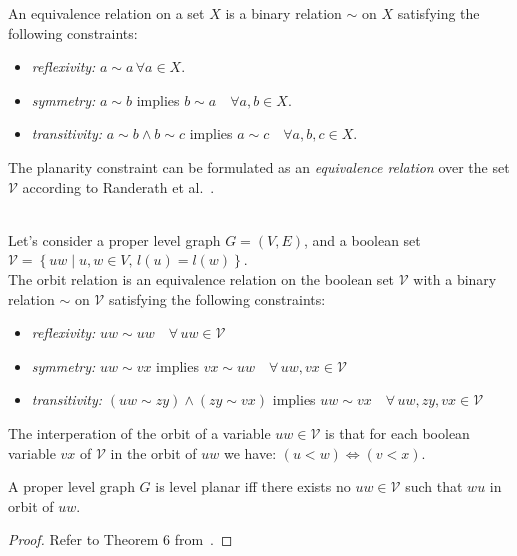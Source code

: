 \begin{definition}
   An equivalence relation on a set $X$ is a binary relation $\sim$ on $X$ satisfying the following constraints: 
   \begin{itemize}
       \item \textit{reflexivity:} $a \sim a \, \forall a \in X$. 
       \item \textit{symmetry:} $a \sim b$ implies $b \sim a \quad \forall a, b \in X$.
       \item \textit{transitivity:} $a \sim b \wedge b \sim c $ implies $a \sim c \quad \forall a, b, c \in X$.
   \end{itemize}
\end{definition}

The planarity constraint can be formulated as an \textit{equivalence relation} over the set $\mathcal{V}$ according to Randerath et
al.~\cite{randerath2001satisfiability}.

\begin{definition}
    \label{def:orbit}
\ \\ 
     Let's consider a proper level graph $G = \left( V,E \right)$, and a boolean set 
    $\mathcal{V} = \left\{ uw \; | \; u,w \in V,\, l\left( u \right)=l\left( w \right)   \right\}$. \\
    The orbit relation is an equivalence relation on the boolean set $\mathcal{V}$ with a binary 
    relation $\sim$ on $\mathcal{V}$ satisfying the following constraints:  
    \begin{itemize}
        \item \textit{reflexivity:} $ uw \sim uw   \quad \forall \, uw \in \mathcal{V} $
        \item \textit{symmetry:} $ uw \sim vx $ implies $ vx \sim uw \quad \forall \, uw, vx \in \mathcal{V} $
        \item \textit{transitivity:} $ \left(uw \sim zy \right) \wedge  \left( zy \sim vx \right) $ implies $ uw \sim vx \quad \forall \, uw, zy, vx \in \mathcal{V} $
    \end{itemize}
\end{definition}

The interperation of the orbit of a variable $uw \in \mathcal{V}$ is that for each boolean variable $vx$ 
of $\mathcal{V}$ in the orbit of $uw$ we have: $\left( u < w \right) \iff \left( v < x \right)$.\cite{randerath2001satisfiability}

\begin{theorem}
    \label{th:randert6}
    A proper level graph $G$ is level planar iff there exists no $uw \in \mathcal{V}$ such that $wu$ in orbit of $uw$. 
\end{theorem}
\begin{proof}
    Refer to Theorem 6 from~\cite{randerath2001satisfiability}.
\end{proof}

